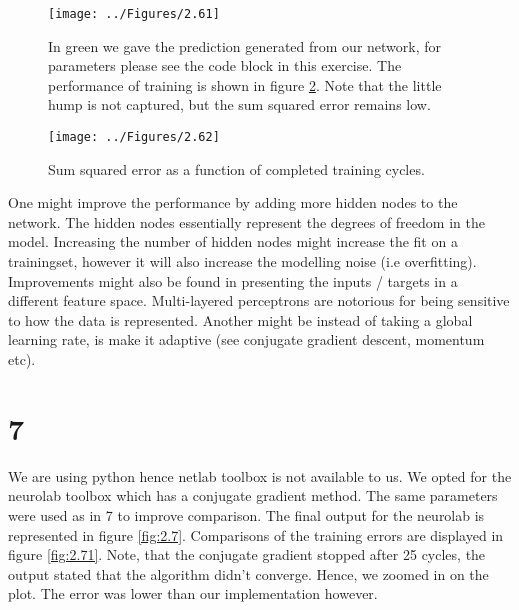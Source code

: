 \documentclass[11pt]{article}
\makeatletter
\def\maxwidth{\ifdim\Gin@nat@width>\linewidth\linewidth
    \else\Gin@nat@width\fi}
\let\Oldincludegraphics\includegraphics
\renewcommand{\includegraphics}[1]{\Oldincludegraphics[width=.8\maxwidth]{#1}}
\makeatother
\begin{document}
	\begin{figure}[H]
		\centering \texttt{[image: ../Figures/2.61]}
		\caption{In green we gave the prediction generated from our network, for parameters please see the code block in this exercise. The performance of training is shown in figure \ref{fig:2.62}. Note that the little hump is not captured, but the sum squared error remains low.}
		\label{fig:2.61}
	\end{figure}

		\begin{figure}[H]
		\centering \texttt{[image: ../Figures/2.62]}
		\caption{Sum squared error as a function of completed training cycles.}
		\label{fig:2.62}
	\end{figure}

    One might improve the performance by adding more hidden nodes to the
network. The hidden nodes essentially represent the degrees of freedom
in the model. Increasing the number of hidden nodes might increase the
fit on a trainingset, however it will also increase the modelling noise
(i.e overfitting). Improvements might also be found in presenting the
inputs / targets in a different feature space. Multi-layered perceptrons
are notorious for being sensitive to how the data is represented.
Another might be instead of taking a global learning rate, is make it
adaptive (see conjugate gradient descent, momentum etc).

    \section{7}\label{section}

    We are using python hence netlab toolbox is not available to us. We
opted for the neurolab toolbox which has a conjugate gradient method.
The same parameters were used as in 7 to improve comparison. The final output for the neurolab is represented in figure \ref{fig:2.7}. Comparisons of the training errors are displayed in figure \ref{fig:2.71}. Note, that the conjugate gradient stopped after 25 cycles, the output stated that the algorithm didn't converge. Hence, we zoomed in on the plot. The error was lower than our implementation however.
\end{document}
